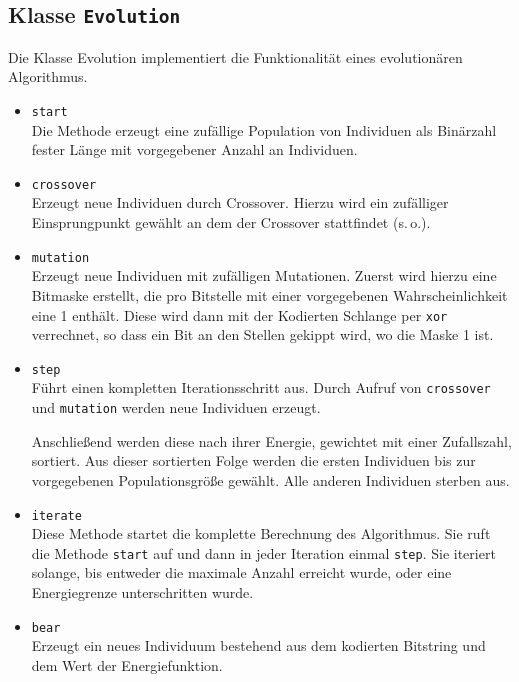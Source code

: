 \documentclass[parskip=half,paper=a4]{scrartcl}
\begin{document}
  \subsection{Klasse \lstinline-Evolution-}
    Die Klasse Evolution implementiert die Funktionalität eines
    evolutionären Algorithmus.
    \begin{itemize}
      \item \lstinline-start-\\
        Die Methode erzeugt eine zufällige Population von Individuen als Binärzahl
        fester Länge mit vorgegebener Anzahl an Individuen.
      \item \lstinline-crossover-\\
        Erzeugt neue Individuen durch Crossover. Hierzu wird ein zufälliger
        Einsprungpunkt gewählt an dem der Crossover stattfindet (s.\,o.).
      \item \lstinline-mutation- \\
        Erzeugt neue Individuen mit zufälligen Mutationen.
        Zuerst wird hierzu eine Bitmaske erstellt, die pro Bitstelle mit einer
        vorgegebenen Wahrscheinlichkeit eine 1 enthält. Diese wird dann mit der
        Kodierten Schlange per \texttt{xor} verrechnet, so dass ein Bit an den
        Stellen gekippt wird, wo die Maske 1 ist.
      \item \lstinline-step-\\
        Führt einen kompletten Iterationsschritt aus. Durch Aufruf von
        \lstinline-crossover- und \lstinline-mutation- werden neue
        Individuen erzeugt.
        
        Anschließend werden diese nach ihrer Energie, gewichtet mit einer
        Zufallszahl, sortiert. Aus dieser sortierten Folge werden die ersten
        Individuen bis zur vorgegebenen Populationsgröße gewählt. Alle
        anderen Individuen sterben aus.
      \item \lstinline-iterate- \\
        Diese Methode startet die komplette Berechnung des Algorithmus.
        Sie ruft die Methode \lstinline-start- auf und dann in jeder
        Iteration einmal \lstinline-step-. Sie iteriert solange, bis entweder die
        maximale Anzahl erreicht wurde, oder eine Energiegrenze unterschritten
        wurde.
      \item \lstinline-bear-\\
        Erzeugt ein neues Individuum bestehend aus dem kodierten Bitstring und
        dem Wert der Energiefunktion.
    \end{itemize}
  
\end{document}
